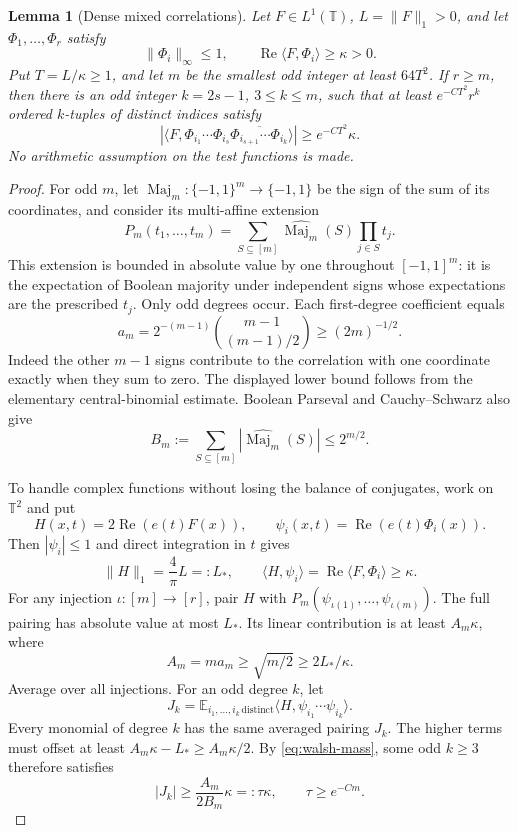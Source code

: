 \documentclass[11pt,reqno]{amsart}
\numberwithin{equation}{section}
\newtheorem{lemma}[theorem]{Lemma}
\theoremstyle{definition}
\theoremstyle{remark}
\newcommand{\T}{\mathbb T}
\newcommand{\E}{\mathbb E}
\newcommand{\norm}[1]{\lVert#1\rVert}
\newcommand{\ip}[2]{\langle#1,#2\rangle}
\DeclareMathOperator{\Rea}{Re}
\DeclareMathOperator{\Maj}{Maj}
\begin{document}
\begin{lemma}[Dense mixed correlations]\label{lem:majority}
Let $F\in L^1(\T)$, $L=\norm F_1>0$, and let
$\Phi_1,\ldots,\Phi_r$ satisfy
\[
 \norm{\Phi_i}_\infty\le1,\qquad
 \Rea\ip F{\Phi_i}\ge\kappa>0.
\]
Put $T=L/\kappa\ge1$, and let $m$ be the smallest odd integer at least
$64T^2$. If $r\ge m$, then there is an odd integer
$k=2s-1$, $3\le k\le m$, such that at least $e^{-CT^2}r^k$ ordered
$k$-tuples of distinct indices satisfy
\begin{equation}\label{eq:good-correlations}
 \left|\ip F{\Phi_{i_1}\cdots\Phi_{i_s}
       \overline{\Phi_{i_{s+1}}\cdots\Phi_{i_k}}}\right|
       \ge e^{-CT^2}\kappa.
\end{equation}
No arithmetic assumption on the test functions is made.
\end{lemma}
\begin{proof}
For odd $m$, let $\Maj_m:\{-1,1\}^m\to\{-1,1\}$ be the sign of the
sum of its coordinates, and consider its multi-affine extension
\[
 P_m(t_1,\ldots,t_m)=
 \sum_{S\subseteq[m]}\widehat{\Maj_m}(S)\prod_{j\in S}t_j.
\]
This extension is bounded in absolute value by one throughout
$[-1,1]^m$: it is the expectation of Boolean majority under independent
signs whose expectations are the prescribed $t_j$. Only odd degrees
occur. Each first-degree coefficient equals
\[
 a_m=2^{-(m-1)}\binom{m-1}{(m-1)/2}\ge(2m)^{-1/2}.
\]
Indeed the other $m-1$ signs contribute to the correlation with one
coordinate exactly when they sum to zero. The displayed lower bound
follows from the elementary central-binomial estimate. Boolean Parseval
and Cauchy--Schwarz also give
\begin{equation}\label{eq:walsh-mass}
 B_m:=\sum_{S\subseteq[m]}|\widehat{\Maj_m}(S)|\le2^{m/2}.
\end{equation}

To handle complex functions without losing the balance of conjugates,
work on $\T^2$ and put
\[
 H(x,t)=2\Rea(e(t)F(x)),\qquad
 \psi_i(x,t)=\Rea(e(t)\Phi_i(x)).
\]
Then $|\psi_i|\le1$ and direct integration in $t$ gives
\begin{equation}\label{eq:phase-lift}
 \norm H_1=\frac4\pi L=:L_*,\qquad
 \ip H{\psi_i}=\Rea\ip F{\Phi_i}\ge\kappa.
\end{equation}
For any injection $\iota:[m]\to[r]$, pair $H$ with
$P_m(\psi_{\iota(1)},\ldots,\psi_{\iota(m)})$. The full pairing has
absolute value at most $L_*$. Its linear contribution is at least
$A_m\kappa$, where
\[
 A_m=ma_m\ge\sqrt{m/2}\ge2L_*/\kappa.
\]
Average over all injections. For an odd degree $k$, let
\[
 J_k=\E_{i_1,\ldots,i_k\,\mathrm{distinct}}
           \ip H{\psi_{i_1}\cdots\psi_{i_k}}.
\]
Every monomial of degree $k$ has the same averaged pairing $J_k$.
The higher terms must offset at least $A_m\kappa-L_*\ge A_m\kappa/2$.
By \eqref{eq:walsh-mass}, some odd $k\ge3$ therefore satisfies
\begin{equation}\label{eq:Jk}
 |J_k|\ge\frac{A_m}{2B_m}\kappa=:\tau\kappa,
 \qquad \tau\ge e^{-Cm}.
\end{equation}


\end{proof}
\end{document}

